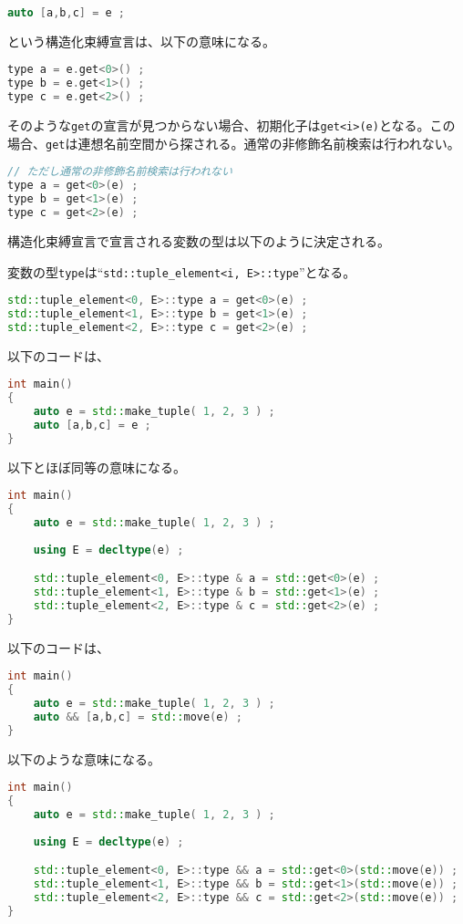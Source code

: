 \begin{lstlisting}[language=C++]
auto [a,b,c] = e ;
\end{lstlisting}
という構造化束縛宣言は、以下の意味になる。

\begin{lstlisting}[language=C++]
type a = e.get<0>() ;
type b = e.get<1>() ;
type c = e.get<2>() ;
\end{lstlisting}

そのような\lstinline!get!の宣言が見つからない場合、初期化子は\lstinline!get<i>(e)!となる。この場合、\lstinline!get!は連想名前空間から探される。通常の非修飾名前検索は行われない。

\begin{lstlisting}[language=C++]
// ただし通常の非修飾名前検索は行われない
type a = get<0>(e) ;
type b = get<1>(e) ;
type c = get<2>(e) ;
\end{lstlisting}

構造化束縛宣言で宣言される変数の型は以下のように決定される。

変数の型\lstinline!type!は``\lstinline!std::tuple_element<i, E>::type!''となる。

\begin{lstlisting}[language=C++]
std::tuple_element<0, E>::type a = get<0>(e) ;
std::tuple_element<1, E>::type b = get<1>(e) ;
std::tuple_element<2, E>::type c = get<2>(e) ;
\end{lstlisting}

以下のコードは、
\begin{lstlisting}[language=C++]
int main()
{
    auto e = std::make_tuple( 1, 2, 3 ) ;
    auto [a,b,c] = e ;
}
\end{lstlisting}
以下とほぼ同等の意味になる。
\begin{lstlisting}[language=C++]
int main()
{
    auto e = std::make_tuple( 1, 2, 3 ) ;
    
    using E = decltype(e) ;

    std::tuple_element<0, E>::type & a = std::get<0>(e) ;
    std::tuple_element<1, E>::type & b = std::get<1>(e) ;
    std::tuple_element<2, E>::type & c = std::get<2>(e) ;
}
\end{lstlisting}

以下のコードは、
\begin{lstlisting}[language=C++]
int main()
{
    auto e = std::make_tuple( 1, 2, 3 ) ;
    auto && [a,b,c] = std::move(e) ;
}
\end{lstlisting}
以下のような意味になる。
\begin{lstlisting}[language=C++]
int main()
{
    auto e = std::make_tuple( 1, 2, 3 ) ;
    
    using E = decltype(e) ;

    std::tuple_element<0, E>::type && a = std::get<0>(std::move(e)) ;
    std::tuple_element<1, E>::type && b = std::get<1>(std::move(e)) ;
    std::tuple_element<2, E>::type && c = std::get<2>(std::move(e)) ;
}
\end{lstlisting}

